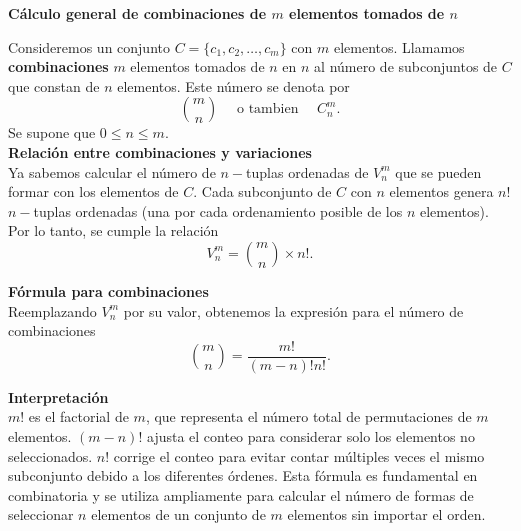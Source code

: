 \documentclass[12pt,a4paper]{book}
\begin{document}
    {\large \textbf{Cálculo general de combinaciones de $m$ elementos tomados de $n$}}

    Consideremos un conjunto $C=\{c_{1},c_{2},\dots,c_{m}\}$ con $m$ elementos. Llamamos
    \textbf{combinaciones} $m$ elementos tomados de $n$ en $n$ al número de subconjuntos de $C$
    que constan de $n$ elementos. Este número se denota por
    \begin{equation*}
        \binom{m}{n}\quad\text{ o tambien }\quad C_{n}^{m}.
    \end{equation*}
    Se supone que $0\leq n\leq m$.\\

    \textbf{Relación entre combinaciones y variaciones}\\
    Ya sabemos calcular el número de $n-$tuplas ordenadas de $V_{n}^{m}$ que se pueden formar con los
    elementos de $C$. Cada subconjunto de $C$ con $n$ elementos genera $n!$ $n-$tuplas ordenadas
    (una por cada ordenamiento posible de los $n$ elementos). Por lo tanto, se cumple la relación
    \begin{equation*}
        V_{n}^{m}=\binom{m}{n}\times n!.
    \end{equation*}

    \textbf{Fórmula para combinaciones}\\
    Reemplazando $V_{n}^{m}$ por su valor, obtenemos la expresión para el número de combinaciones
    \begin{equation*}
        \binom{m}{n}=\frac{m!}{(m-n)!n!}.
    \end{equation*}

    \textbf{Interpretación}\\
    $m!$ es el factorial de $m$, que representa el número total de permutaciones de $m$ elementos.
    $(m-n)!$ ajusta el conteo para considerar solo los elementos no seleccionados. $n!$ corrige
    el conteo para evitar contar múltiples veces el mismo subconjunto debido a los diferentes
    órdenes. Esta fórmula es fundamental en combinatoria y se utiliza ampliamente para calcular
    el número de formas de seleccionar $n$ elementos de un conjunto de $m$ elementos sin importar
    el orden.
    
\end{document}

